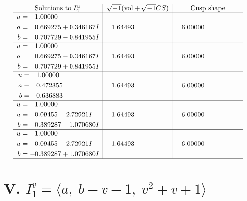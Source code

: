 \documentclass[1p]{elsarticle_modified}
\theoremstyle{definition}
\newcommand{\I}{\sqrt{-1}}
\begin{document}
$$\begin{array}{c|c|c}  
\text{Solutions to }I^u_{4}& \I (\text{vol} + \sqrt{-1}CS) & \text{Cusp shape}\\
 \hline 
\begin{aligned}
u &= \phantom{-}1.00000\phantom{ +0.000000I} \\
a &= \phantom{-}0.669275 + 0.346167 I \\
b &= \phantom{-}0.707729 - 0.841955 I\end{aligned}
 & \phantom{-}1.64493\phantom{ +0.000000I} & \phantom{-}6.00000\phantom{ +0.000000I} \\ \hline\begin{aligned}
u &= \phantom{-}1.00000\phantom{ +0.000000I} \\
a &= \phantom{-}0.669275 - 0.346167 I \\
b &= \phantom{-}0.707729 + 0.841955 I\end{aligned}
 & \phantom{-}1.64493\phantom{ +0.000000I} & \phantom{-}6.00000\phantom{ +0.000000I} \\ \hline\begin{aligned}
u &= \phantom{-}1.00000\phantom{ +0.000000I} \\
a &= \phantom{-}0.472355\phantom{ +0.000000I} \\
b &= -0.636883\phantom{ +0.000000I}\end{aligned}
 & \phantom{-}1.64493\phantom{ +0.000000I} & \phantom{-}6.00000\phantom{ +0.000000I} \\ \hline\begin{aligned}
u &= \phantom{-}1.00000\phantom{ +0.000000I} \\
a &= \phantom{-}0.09455 + 2.72921 I \\
b &= -0.389287 - 1.070680 I\end{aligned}
 & \phantom{-}1.64493\phantom{ +0.000000I} & \phantom{-}6.00000\phantom{ +0.000000I} \\ \hline\begin{aligned}
u &= \phantom{-}1.00000\phantom{ +0.000000I} \\
a &= \phantom{-}0.09455 - 2.72921 I \\
b &= -0.389287 + 1.070680 I\end{aligned}
 & \phantom{-}1.64493\phantom{ +0.000000I} & \phantom{-}6.00000\phantom{ +0.000000I}\\
 \hline 
 \end{array}$$\newpage\newpage\renewcommand{\arraystretch}{1}
\centering \section*{V. $I^v_{1}= \langle a,\;b- v-1,\;v^2+v+1 \rangle$}
\end{document}
